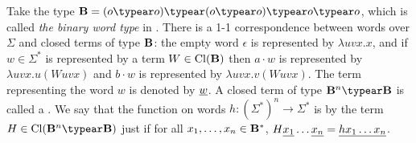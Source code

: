 Take the type $\zaiwordtyp = (o\typear o)\typear (o\typear o)\typear
o\typear o$, which is called \emph{the binary word type} in
\cite{DBLP:journals/tcs/Zaionc87}. There is a 1-1 correspondence
between words over $\Sigma$ and closed terms of type $\mathbf{B}$:
the empty word $\epsilon$ is represented by $\lambda u v x.x$, and
if $w\in \Sigma^*$ is represented by a term $W \in
{\rm Cl}(\mathbf{B})$ then $a \cdot w$ is represented by $\lambda
u v x. u(W uvx)$ and $b \cdot w$ is represented by $\lambda u v x.
v(W uvx)$. The term representing the word $w$ is denoted by
$\underline{w}$. A closed term of type $\zaiwordtyp^n \typear
\zaiwordtyp$ is called a . We say that the
function on words $h:(\Sigma^*)^n \rightarrow \Sigma^*$ is
 by the term $H \in \closedof{\zaiwordtyp^n
\typear \zaiwordtyp}$ just if for all $x_1, \ldots, x_n \in
\mathbf{B}^*$, $H \underline{x_1} \ldots \underline{x_n} =
\underline{h x_1 \ldots x_n}$. \bigskip

